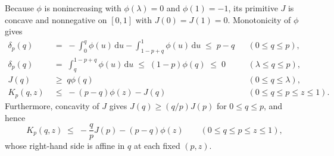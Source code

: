 \documentclass[11pt]{article}
\numberwithin{equation}{section}
\theoremstyle{plain}
\theoremstyle{definition}
\newcommand{\1}{\mathbf{1}}
\begin{document}
Because $\phi$ is nonincreasing with $\phi(\lambda) = 0$ and $\phi(1) = -1$, its primitive $J$ is concave and nonnegative on $[0, 1]$ with $J(0) = J(1) = 0$. Monotonicity of $\phi$ gives
\begin{equation}
  \begin{aligned}
    \delta_p(q) &\;=\; -\int_0^q \phi(u)\,\mathrm{d}u - \int_{1 - p + q}^1 \phi(u)\,\mathrm{d}u \;\le\; p - q && (0 \le q \le p), \\
    \delta_p(q) &\;=\; \int_q^{1 - p + q} \phi(u)\,\mathrm{d}u \;\le\; (1 - p)\phi(q) \;\le\; 0 && (\lambda \le q \le p), \\
    J(q) &\;\ge\; q\phi(q) && (0 \le q \le \lambda), \\
    K_p(q, z) &\;\le\; -(p - q)\phi(z) - J(q) && (0 \le q \le p \le z \le 1).
  \end{aligned}
  \label{eq:elementary-packing-bounds}
\end{equation}
Furthermore, concavity of $J$ gives $J(q) \ge (q/p)J(p)$ for $0 \le q \le p$, and hence
\begin{equation}
  K_p(q, z) \;\le\; -\frac{q}{p}J(p) - (p - q)\phi(z)
  \qquad (0 \le q \le p \le z \le 1),
  \label{eq:Kp-secant}
\end{equation}
whose right-hand side is affine in $q$ at each fixed $(p, z)$.
\end{document}
